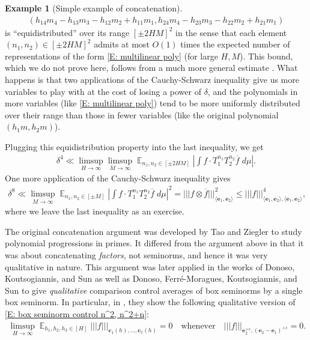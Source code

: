 \documentclass[11pt]{amsart}
\theoremstyle{definition}
\newtheorem{example}[lemma]{Example}
\DeclareMathOperator*{\E}{\mathbb{E}}
\newcommand{\bc}{{\mathbf{c}}}
\newcommand{\be}{{\mathbf{e}}}
\newcommand{\nnorm}[1]{\lvert\!|\!| #1|\!|\!\rvert}
\newcommand{\1}{{\mathbf{1}}}
\newcommand{\abs}[1]{\mathopen{}\left| #1\mathclose{}\right|}
\begin{document}
\begin{example}[Simple example of concatenation]
    \begin{align}\label{E: multilinear poly}
        (h_{14} m_4 -h_{13} m_3- h_{12} m_2 +h_{11} m_1, h_{24} m_4 -h_{23} m_3- h_{22} m_2 +h_{21} m_1)
    \end{align}
    is ``equidistributed'' over its range $[\pm 2HM]^2$ in the sense that each element $(n_1,n_2)\in[\pm 2HM]^2$ admits at most $O(1)$ times the expected number of representations of the form \eqref{E: multilinear poly} (for large $H,M$). This bound, which we do not prove here, follows from a much more general estimate \cite[Proposition 7.5]{KKL24a}.
    What happens is that two applications of the Cauchy-Schwarz inequality give us more variables to play with at the cost of losing a power of $\delta$, and the polynomials in more variables (like \eqref{E: multilinear poly}) tend to be more uniformly distributed over their range than those in fewer variables (like the original polynomial $(h_1 m, h_2 m)$).
    
    Plugging this equidistribution property into the last inequality, we get
    \begin{align*}
        \delta^4 \ll \limsup_{H\to\infty}\limsup_{M\to\infty}\E_{n_1,n_2\in[\pm 2 HM]}\abs{\int f\cdot T_1^{n_1}T_2^{n_2}\overline{f}\; d\mu}.
    \end{align*}
    One more application of the Cauchy-Schwarz inequality gives
    \begin{align*}
        \delta^8 \ll  \limsup_{M\to\infty}\E_{n_1,n_2\in[\pm M]}\abs{\int f\cdot T_1^{n_1}T_2^{n_2}\overline{f}\; d\mu}^2 = \nnorm{f\otimes \overline f}_{\langle \be_1,\be_2\rangle}^2 \leq\nnorm{f}_{\langle \be_1,\be_2\rangle, \langle \be_1,\be_2\rangle}^4,
    \end{align*}
    where we leave the last inequality as an exercise. 
\end{example}

The original concatenation argument was developed by Tao and Ziegler \cite{TZ16} to study polynomial progressions in primes. It differed from the argument above in that it was about concatenating \emph{factors}, not seminorms, and hence it was very qualitative in nature. This argument was later applied in the works of Donoso, Koutsogiannis, and Sun \cite{DKS22, DKS23} as well as Donoso, Ferr\'e-Moragues, Koutsogiannis, and Sun \cite{DFKS22} to give \emph{qualitative} comparison control averages of box seminorms 
by a single box seminorm. In particular, in \cite[Example 8]{DFKS22}, they show the following qualitative version of \eqref{E: box seminorm control n^2, n^2+n}:
\begin{align}\label{E: box seminorm control n^2, n^2+n infinitary}
    \limsup_{H\to\infty}\E_{h_1,h_2,h_3\in[H]}\nnorm{f}_{\bc_1(h), \ldots, \bc_7(h)} = 0\quad \textrm{whenever}\quad \nnorm{f}_{\be_2^{\times s}, (\be_2-\be_1)^{\times s}} = 0.
\end{align}
\end{document}
